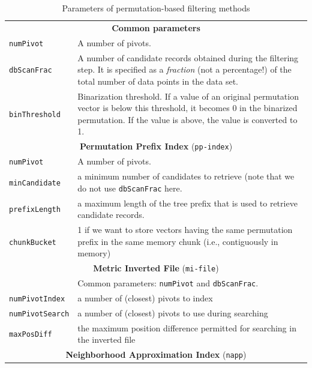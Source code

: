 \documentclass[runningheads,a4paper]{llncs}
\newcommand{\ttt}[1]{\texttt{#1}}
\begin{document}
\begin{table}
\caption{Parameters of permutation-based filtering methods\label{TablePermMethodParams}}
\centering
\begin{tabular}{l@{\hspace{2mm}}p{3.5in}}
\toprule
\multicolumn{2}{c}{\textbf{Common parameters}}\\
\cmidrule(l){1-2} 
\ttt{numPivot}      & A number of pivots. \\
\ttt{dbScanFrac}    & A number of candidate records obtained during the filtering step.
It is specified as a \emph{fraction} (not a percentage!) of 
the total number of data points in the data set. \\
\ttt{binThreshold}  & Binarization threshold.
If a value of an original permutation vector is below this threshold, 
it becomes 0 in the binarized permutation. If the 
value is above, the value is converted to 1.
\\
\cmidrule(l){1-2} 
\multicolumn{2}{c}{\textbf{Permutation Prefix Index} (\ttt{pp-index}) \cite{Esuli:2012}  }\\
\cmidrule(l){1-2} 
\ttt{numPivot}      & A number of pivots. \\
\ttt{minCandidate} & a minimum number of candidates to retrieve (note that we do not use
\ttt{dbScanFrac} here. \\
\ttt{prefixLength} & a maximum length of the tree prefix that is used to 
retrieve candidate records. \\
\ttt{chunkBucket} & 1 if we want to store vectors having the same permutation prefix
 in the same memory chunk (i.e., contiguously in memory) \\
\cmidrule(l){1-2} 
\multicolumn{2}{c}{\textbf{Metric Inverted File} (\ttt{mi-file}) \cite{amato2008approximate}  }\\
\cmidrule(l){1-2} 
                     & Common parameters: \ttt{numPivot} and \ttt{dbScanFrac}. \\
\ttt{numPivotIndex}  & a number of (closest) pivots to index                         \\
\ttt{numPivotSearch} & a number of (closest) pivots to use during searching          \\
\ttt{maxPosDiff}     & the maximum position difference permitted for searching      
in the inverted file \\
\cmidrule(l){1-2} 
\multicolumn{2}{c}{\textbf{Neighborhood Approximation Index} (\ttt{napp}) \cite{tellez2013succinct}  }\\
\cmidrule(l){1-2} 

\end{tabular}
\end{table}
\end{document}
